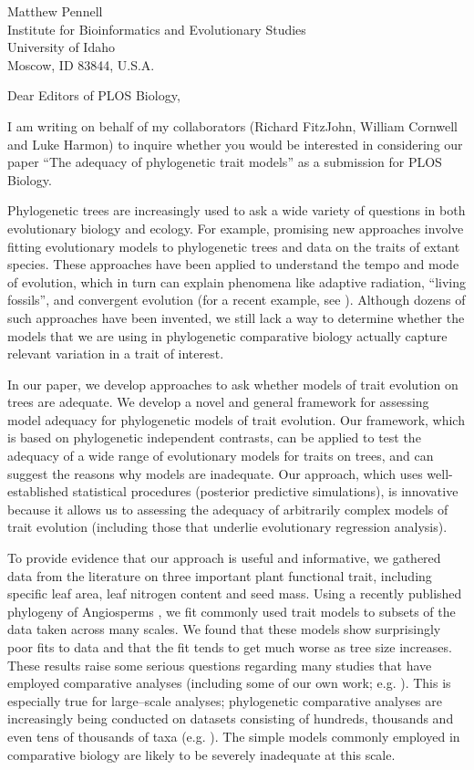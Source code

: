 \documentclass[a4paper,12pt]{article}
\begin{document}
{\raggedleft
  Matthew Pennell\\
  Institute for Bioinformatics and Evolutionary Studies\\
  University of Idaho\\
 Moscow, ID 83844, U.S.A.\\[2ex]
}

\vspace{3ex}

Dear Editors of PLOS Biology,

I am writing on behalf of my collaborators (Richard FitzJohn, William Cornwell and Luke Harmon) to inquire whether you would be interested in considering our paper ``The adequacy of phylogenetic trait models'' as a submission for PLOS Biology. 

Phylogenetic trees are increasingly used to ask a wide variety of questions in both evolutionary biology and ecology. For example, promising new approaches involve fitting evolutionary models to phylogenetic trees and data on the traits of extant species. These approaches have been applied to understand the tempo and mode of evolution, which in turn can explain phenomena like adaptive radiation, ``living fossils'', and convergent evolution (for a recent example, see \citep{Mahler2013}). Although dozens of such approaches have been invented, we still lack a way to determine whether the models that we are using in phylogenetic comparative biology actually capture relevant variation in a trait of interest. 

In our paper, we develop approaches to ask whether models of trait evolution on trees are adequate. We develop a novel and general framework for assessing model adequacy for phylogenetic models of trait evolution.  Our framework, which is based on phylogenetic independent contrasts, can be applied to test the adequacy of a wide range of evolutionary models for traits on trees, and can suggest the reasons why models are inadequate. Our approach, which uses well-established statistical procedures (posterior predictive simulations), is innovative because it allows us to assessing the adequacy of arbitrarily complex models of trait evolution (including those that underlie evolutionary regression analysis).

To provide evidence that our approach is useful and informative, we gathered data from the literature on three important plant functional trait, including specific leaf area, leaf nitrogen content and seed mass. Using a recently published phylogeny of Angiosperms \citep{Zanne2013}, we fit commonly used trait models to subsets of the data taken across many scales. We found that these models show surprisingly poor fits to data and that the fit tends to get much worse as tree size increases. These results raise some serious questions regarding many studies that have employed comparative analyses (including some of our own work; e.g. \citep{Harmon2010}). This is especially true for large--scale analyses; phylogenetic comparative analyses are increasingly being conducted on datasets consisting of hundreds, thousands and even tens of thousands of taxa (e.g. \citep{Venditti2011, Rabosky2013}). The simple models commonly employed in comparative biology are likely to be severely inadequate at this scale. 
\end{document}
